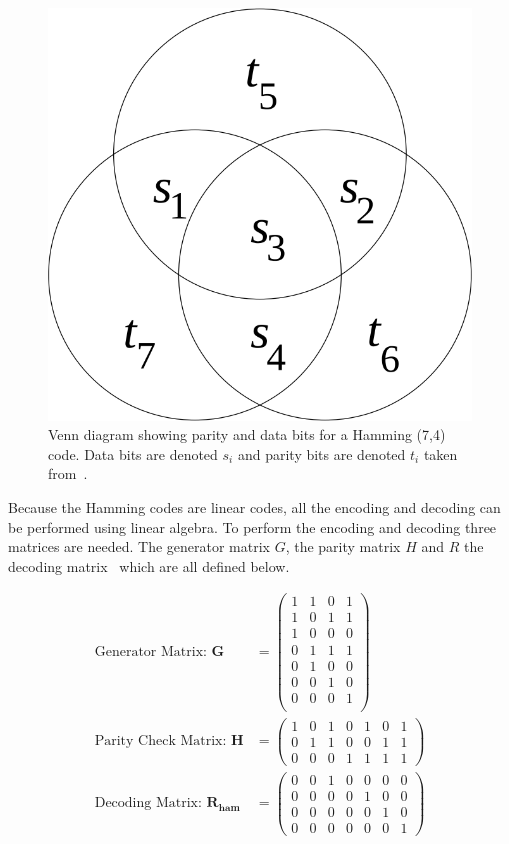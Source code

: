 \documentclass[12pt,onecolumn,letterpaper]{article}
\begin{document}
\begin{figure}
   \centering
   \includegraphics[width=0.2\linewidth]{figures/hamming_parity_venn_diagram.png}
   \caption{Venn diagram showing parity and data bits for a Hamming (7,4) code. Data bits are denoted $s_i$ and parity bits are denoted $t_i$ taken from~\cite{HammingMoonBook}.}
   \label{fig:HammingParityVennDiagram}
\end{figure}

Because the Hamming codes are linear codes, all the encoding and decoding can be performed using linear algebra. To perform the encoding and decoding three matrices are needed. The generator matrix $G$, the parity matrix $H$ and $R$ the decoding matrix~\cite{HammingMoonBook} which are all defined below.

\begin{align}
   \mbox{Generator Matrix: }\mathbf{G} &= \begin{pmatrix}
      1 & 1 & 0 & 1\\ 
      1 & 0 & 1 & 1\\ 
      1 & 0 & 0 & 0\\ 
      0 & 1 & 1 & 1\\ 
      0 & 1 & 0 & 0\\ 
      0 & 0 & 1 & 0\\ 
      0 & 0 & 0 & 1 \\
      \end{pmatrix} \\
   \mbox{Parity Check Matrix: }\mathbf{H} &= \begin{pmatrix}
      1 & 0 & 1 & 0 & 1 & 0 & 1\\ 
      0 & 1 & 1 & 0 & 0 & 1 & 1\\ 
      0 & 0 & 0 & 1 & 1 & 1 & 1
      \end{pmatrix} \\
   \mbox{Decoding Matrix: }\mathbf{R_{ham}} &= \begin{pmatrix}
      0 & 0 & 1 & 0 & 0 & 0 & 0\\ 
      0 & 0 & 0 & 0 & 1 & 0 & 0\\ 
      0 & 0 & 0 & 0 & 0 & 1 & 0\\ 
      0 & 0 & 0 & 0 & 0 & 0 & 1
      \end{pmatrix}
\end{align}
\end{document}
